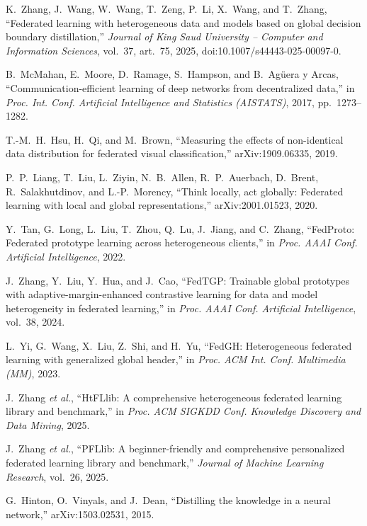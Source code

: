 K.~Zhang, J.~Wang, W.~Wang, T.~Zeng, P.~Li, X.~Wang, and T.~Zhang, ``Federated learning with heterogeneous data and models based on global decision boundary distillation,'' \emph{Journal of King Saud University -- Computer and Information Sciences}, vol.~37, art.~75, 2025, doi:10.1007/s44443-025-00097-0.

B.~McMahan, E.~Moore, D.~Ramage, S.~Hampson, and B.~Ag\"{u}era y Arcas, ``Communication-efficient learning of deep networks from decentralized data,'' in \emph{Proc. Int. Conf. Artificial Intelligence and Statistics (AISTATS)}, 2017, pp.~1273--1282.

T.-M.~H.~Hsu, H.~Qi, and M.~Brown, ``Measuring the effects of non-identical data distribution for federated visual classification,'' arXiv:1909.06335, 2019.

P.~P.~Liang, T.~Liu, L.~Ziyin, N.~B.~Allen, R.~P.~Auerbach, D.~Brent, R.~Salakhutdinov, and L.-P.~Morency, ``Think locally, act globally: Federated learning with local and global representations,'' arXiv:2001.01523, 2020.

Y.~Tan, G.~Long, L.~Liu, T.~Zhou, Q.~Lu, J.~Jiang, and C.~Zhang, ``FedProto: Federated prototype learning across heterogeneous clients,'' in \emph{Proc. AAAI Conf. Artificial Intelligence}, 2022.

J.~Zhang, Y.~Liu, Y.~Hua, and J.~Cao, ``FedTGP: Trainable global prototypes with adaptive-margin-enhanced contrastive learning for data and model heterogeneity in federated learning,'' in \emph{Proc. AAAI Conf. Artificial Intelligence}, vol.~38, 2024.

L.~Yi, G.~Wang, X.~Liu, Z.~Shi, and H.~Yu, ``FedGH: Heterogeneous federated learning with generalized global header,'' in \emph{Proc. ACM Int. Conf. Multimedia (MM)}, 2023.

J.~Zhang \emph{et al.}, ``HtFLlib: A comprehensive heterogeneous federated learning library and benchmark,'' in \emph{Proc. ACM SIGKDD Conf. Knowledge Discovery and Data Mining}, 2025.

J.~Zhang \emph{et al.}, ``PFLlib: A beginner-friendly and comprehensive personalized federated learning library and benchmark,'' \emph{Journal of Machine Learning Research}, vol.~26, 2025.

G.~Hinton, O.~Vinyals, and J.~Dean, ``Distilling the knowledge in a neural network,'' arXiv:1503.02531, 2015.

